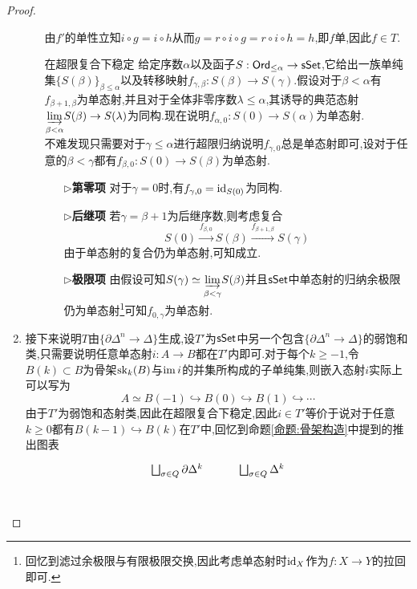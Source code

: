 \begin{proof}
\begin{enumerate}
\begin{enumerate}
\[            \]
            由$f'$的单性立知$i\circ g = i\circ h$从而$g = r\circ i \circ g =r\circ i \circ h = h$,即$f$单,因此$f\in T$.
            \item[在超限复合下稳定] 给定序数$\alpha$以及函子$S: \mathsf{Ord}_{\leq \alpha} \to \mathsf{sSet}$,它给出一族单纯集$\{S(\beta)\}_{\beta \leq \alpha}$以及转移映射$f_{\gamma,\beta}: S(\beta) \to S(\gamma)$.假设对于$\beta < \alpha$有$f_{\beta+1,\beta}$为单态射,并且对于全体非零序数$\lambda \leq \alpha$,其诱导的典范态射$\underset{\beta <\alpha}{\underrightarrow{\lim}} S(\beta) \to S(\lambda)$为同构.现在说明$f_{\alpha,0}: S(0) \to S(\alpha)$为单态射.\\
            不难发现只需要对于$\gamma\leq \alpha$进行超限归纳说明$f_{\gamma,0}$总是单态射即可,设对于任意的$\beta < \gamma$都有$f_{\beta,0}:S(0) \to S(\beta)$为单态射.
            \begin{enumerate}
                \item[$\triangleright$\textbf{第零项}] 对于$\gamma = 0$时,有$f_{\gamma,0} = \mathrm{id}_{S(0)}$为同构.
                \item[$\triangleright$\textbf{后继项}] 若$\gamma = \beta +1$为后继序数,则考虑复合
                \[
                    S(0) \xrightarrow{f_{\beta,0}} S(\beta) \xrightarrow{f_{\beta+1,\beta}} S(\gamma)
                \]
                由于单态射的复合仍为单态射,可知成立.
                \item[$\triangleright$\textbf{极限项}] 由假设可知$S(\gamma) \simeq \underset{\beta < \gamma}{\underrightarrow{\lim}} S(\beta)$并且$\mathsf{sSet}$中单态射的归纳余极限仍为单态射\footnote{回忆到滤过余极限与有限极限交换,因此考虑单态射时$\mathrm{id}_X$作为$f:X\to Y$的拉回即可.}可知$f_{0,\gamma}$为单态射.
            \end{enumerate}
        \end{enumerate}
        \item 接下来说明$T$由$\{\partial \Delta^n \to \Delta\}$生成,设$T'$为$\mathsf{sSet}$中另一个包含$\{\partial \Delta^n \to \Delta\}$的弱饱和类,只需要说明任意单态射$i : A \to B$都在$T'$内即可.对于每个$k \geq -1$,令$B(k) \subset B$为骨架$\operatorname{sk}_k(B)$与$\operatorname{im} i$的并集所构成的子单纯集,则嵌入态射$i$实际上可以写为
        \[
            A\simeq B(-1)\hookrightarrow B(0) \hookrightarrow B(1) \hookrightarrow \cdots
        \]
        由于$T'$为弱饱和态射类,因此在超限复合下稳定,因此$i \in T'$等价于说对于任意$k\geq 0$都有$B(k-1) \hookrightarrow B(k)$在$T'$中,回忆到命题\ref{命题:骨架构造}中提到的推出图表
        \[\begin{tikzcd}
    	{\bigsqcup_{\sigma\in Q}\partial \Delta^k} & {\bigsqcup_{\sigma\in Q}\Delta^k} \\

\end{tikzcd}\]
\end{enumerate}
\end{proof}
